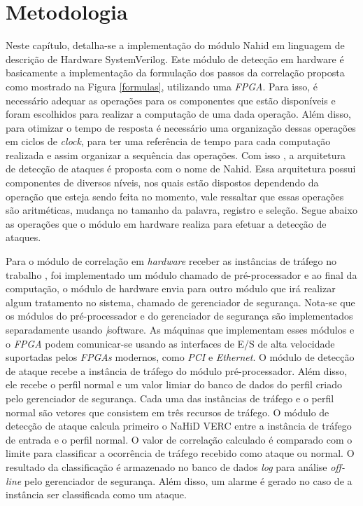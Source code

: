 \chapter[Metodologia]{Metodologia}
\label{metodologia}
Neste capítulo, detalha-se a implementação do módulo Nahid em linguagem de descrição de Hardware SystemVerilog. Este  módulo de detecção em hardware é basicamente a implementação da formulação dos passos da correlação proposta como mostrado na Figura \ref{formulas}, utilizando uma \textit{FPGA}. Para isso, é necessário adequar  as operações para os componentes que estão disponíveis e foram escolhidos para realizar a computação de uma dada operação.  Além disso, para otimizar o tempo de resposta é necessário uma organização dessas operações em ciclos de \textit{clock}, para ter uma referência de tempo  para cada computação realizada e assim organizar a sequência das operações. Com isso , a arquitetura de detecção de ataques é proposta com o nome de Nahid. Essa arquitetura possui componentes de diversos níveis, nos quais estão dispostos dependendo da operação que esteja sendo feita no momento, vale ressaltar que essas operações são aritméticas, mudança no tamanho da palavra, registro e seleção. Segue abaixo as operações que o módulo em hardware realiza para efetuar a detecção de ataques.

Para o módulo de correlação em \textit{hardware} receber as instâncias de tráfego no trabalho \cite{HOQUE201748}, foi implementado  um módulo  chamado de pré-processador e ao final da computação, o módulo de hardware envia para outro módulo que irá realizar algum tratamento no sistema, chamado de gerenciador de segurança. Nota-se que os módulos do pré-processador e do gerenciador de segurança são implementados separadamente usando \textit|{software}. As máquinas que implementam esses módulos e o \textit{FPGA} podem comunicar-se usando as interfaces de E/S de alta velocidade suportadas pelos \textit{FPGAs} modernos, como \textit{PCI} e \textit{Ethernet}. O módulo de detecção de ataque recebe a instância de tráfego do módulo pré-processador. Além disso, ele recebe o perfil normal e um valor limiar do banco de dados do perfil criado pelo gerenciador de segurança. Cada uma das instâncias de tráfego e o perfil normal são vetores que consistem em três recursos de tráfego. O módulo de detecção de ataque calcula primeiro o NaHiD VERC entre a instância de tráfego de entrada e o perfil normal. O valor de correlação calculado é comparado com o limite para classificar a ocorrência de tráfego recebido como ataque ou normal. O resultado da classificação é armazenado no banco de dados \textit{log} para análise \textit{off-line} pelo gerenciador de segurança. Além disso, um alarme é gerado no caso de a instância ser classificada como um ataque.

